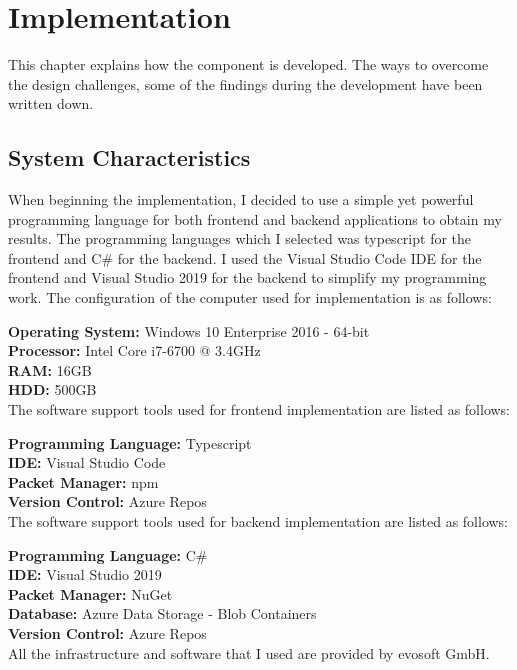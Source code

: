 %
\section{Implementation}\label{sec:implementation}
This chapter explains how the component is developed. The ways to overcome the design challenges, some of the findings during the development have been written down.
%
\subsection{System Characteristics}
When beginning the implementation, I decided to use a simple yet powerful programming language for both frontend and backend applications to obtain my results. The programming languages which I selected was typescript for the frontend and C\# for the backend. I used the Visual Studio Code IDE for the frontend and Visual Studio 2019 for the backend to simplify my programming work. The configuration of the computer used for implementation is as follows:

{\bf Operating System:} Windows 10 Enterprise 2016 - 64-bit\\
{\bf Processor:} Intel Core i7-6700 @ 3.4GHz\\
{\bf RAM:} 16GB\\
{\bf HDD:} 500GB\\


The software support tools used for frontend implementation are listed as follows:

{\bf Programming Language:} Typescript\\
{\bf IDE:} Visual Studio Code\\
{\bf Packet Manager:} npm\\
{\bf Version Control:} Azure Repos\\


The software support tools used for backend implementation are listed as follows:

{\bf Programming Language:} C\#\\
{\bf IDE:} Visual Studio 2019\\
{\bf Packet Manager:} NuGet\\
{\bf Database:} Azure Data Storage - Blob Containers\\
{\bf Version Control:} Azure Repos\\


All the infrastructure and software that I used are provided by evosoft GmbH.

